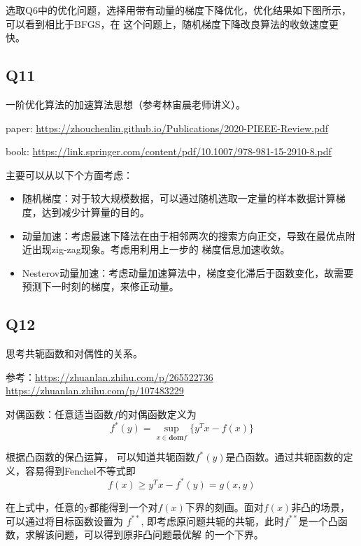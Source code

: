 \documentclass{article}
\begin{document}
    选取Q6中的优化问题，选择用带有动量的梯度下降优化，优化结果如下图所示，可以看到相比于BFGS，在
    这个问题上，随机梯度下降改良算法的收敛速度更快。



    \subsection*{Q11}
    一阶优化算法的加速算法思想（参考林宙晨老师讲义）。

    paper: \url{https://zhouchenlin.github.io/Publications/2020-PIEEE-Review.pdf}

    book: \url{https://link.springer.com/content/pdf/10.1007/978-981-15-2910-8.pdf}


    主要可以从以下个方面考虑：
    \begin{itemize}
        \item 随机梯度：对于较大规模数据，可以通过随机选取一定量的样本数据计算梯度，达到减少计算量的目的。
        \item 动量加速：考虑最速下降法在由于相邻两次的搜索方向正交，导致在最优点附近出现zig-zag现象。考虑用利用上一步的
        梯度信息加速收敛。
        \item Nesterov动量加速：考虑动量加速算法中，梯度变化滞后于函数变化，故需要预测下一时刻的梯度，来修正动量。
    \end{itemize}


    \subsection*{Q12}

    思考共轭函数和对偶性的关系。

    参考：\url{https://zhuanlan.zhihu.com/p/265522736}\\
    \url{https://zhuanlan.zhihu.com/p/107483229}

    对偶函数：任意适当函数$f$的对偶函数定义为
    \begin{equation*}
        f^*(y) = \sup_{x \in \mathbf{dom} f} \{ y^Tx - f(x)\}
    \end{equation*}

    根据凸函数的保凸运算， 可以知道共轭函数$f^*(y)$是凸函数。通过共轭函数的定义，容易得到Fenchel不等式即
    \begin{equation*}
        f(x) \ge y^Tx - f^*(y) = g(x,y)
    \end{equation*}

    在上式中，任意的y都能得到一个对$f(x)$下界的刻画。面对$f(x)$非凸的场景，可以通过将目标函数设置为
    $f^{**}$, 即考虑原问题共轭的共轭，此时$f^{**}$是一个凸函数，求解该问题，可以得到原非凸问题最优解
    的一个下界。
\end{document}
